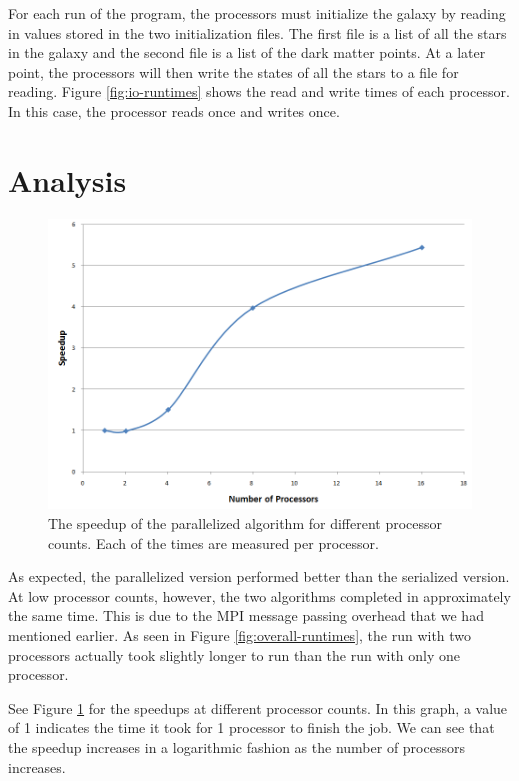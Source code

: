\documentclass{article}
\begin{document}
For each run of the program, the processors must initialize the galaxy by reading in values stored in the two initialization files.  The first file is a list of all the stars in the galaxy and the second file is a list of the dark matter points.  At a later point, the processors will then write the states of all the stars to a file for reading.  Figure \ref{fig:io-runtimes} shows the read and write times of each processor.  In this case, the processor reads once and writes once.

\section{Analysis}

\begin{figure}
\centering
\includegraphics[width=\columnwidth]{speedups-overall.png}
\caption{The speedup of the parallelized algorithm for different processor counts.  Each of the times are measured per processor. \label{fig:speedups-overall}}
\end{figure} 

As expected, the parallelized version performed better than the serialized version.  At low processor counts, however, the two algorithms completed in approximately the same time.  This is due to the MPI message passing overhead that we had mentioned earlier. As seen in Figure \ref{fig:overall-runtimes}, the run with two processors actually took slightly longer to run than the run with only one processor.  

See Figure \ref{fig:speedups-overall} for the speedups at different processor counts.  In this graph, a value of 1 indicates the time it took for 1 processor to finish the job. We can see that the speedup increases in a logarithmic fashion as the number of processors increases.
\end{document}
